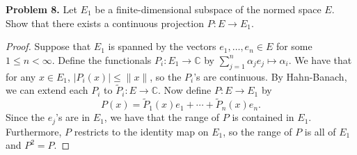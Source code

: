 \documentclass[11pt,letterpaper]{report}
\newcommand{\complex}{\mathbb{C}}
\begin{document}
\noindent\textbf{Problem 8. }
Let $E_1$ be a finite-dimensional subspace of the normed space $E$. Show that there exists a continuous projection $P:E\to E_1$.
\begin{proof}
	Suppose that $E_1$ is spanned by the vectors $e_1, \ldots, e_n\in E$ for some $1\leq n<\infty$. Define the functionals $P_i: E_1\to \complex$ by $\sum_{j=1}^n \alpha_j e_j\mapsto \alpha_i$. We have that for any $x\in E_1$, $|P_i(x)|\leq \|x\|$, so the $P_i$'s are continuous. By Hahn-Banach, we can extend each $P_i$ to $\tilde{P}_i: E\to \complex$. Now define $P: E\to E_1$ by
	\[
	P(x) = \tilde{P}_1(x)e_1 + \cdots +\tilde{P}_n(x)e_n.
	\]
	Since the $e_j$'s are in $E_1$, we have that the range of $P$ is contained in $E_1$. Furthermore, $P$ restricts to the identity map on $E_1$, so the range of $P$ is all of $E_1$ and $P^2 = P$.
\end{proof}
\end{document}
